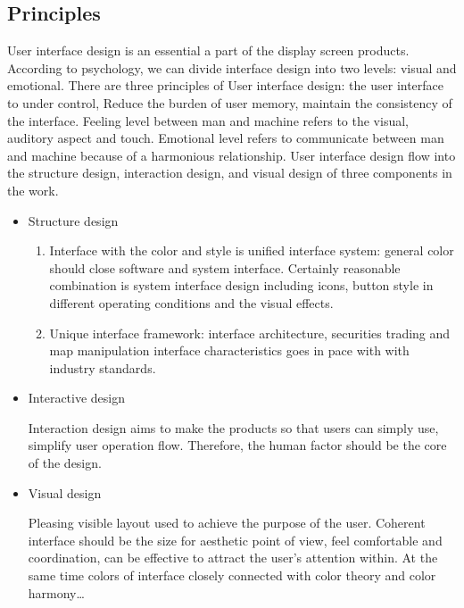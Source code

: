 \documentclass[10pt,twoside,english,a4paper]{article}
\begin{document}
\subsection{Principles} 
User interface design is an essential a part of the display screen products. According to psychology, we can divide interface design into two levels: visual and emotional. There are three principles of User interface design: the user interface to under control, Reduce the burden of user memory, maintain the consistency of the interface. Feeling level between man and machine refers to the visual, auditory aspect and touch. Emotional level refers to communicate between man and machine because of a harmonious relationship. User interface design flow into the structure design, interaction design, and visual design of three components in the work\cite{XiangqianFu2010}.

\begin{itemize}
\item Structure design
\begin{enumerate}

\item Interface with the color and style is unified interface system: general color should close software and system interface. Certainly reasonable combination is system interface design including icons, button style in different operating conditions and the visual effects.
\item Unique interface framework: interface architecture, securities trading and map manipulation interface characteristics goes in pace with with industry standards.
	\end{enumerate}
\item Interactive design

Interaction design aims to make the products so that users can simply use, simplify user operation flow. Therefore, the human factor should be the core of the design.

\item Visual design

Pleasing visible layout used to achieve the purpose of the user. Coherent interface should be the size for aesthetic point of view, feel comfortable and coordination, can be effective to attract the user's attention within. At the same time colors of interface closely connected with color theory and color harmony…
\end{itemize}
\end{document}
